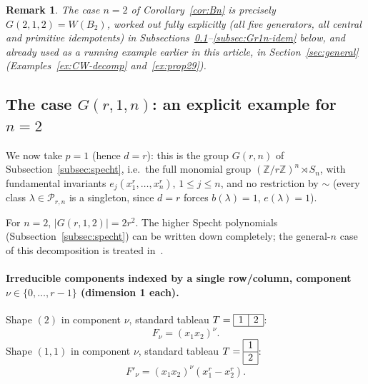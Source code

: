 \documentclass[11pt,a4paper]{article}
\newtheorem{remark}[theorem]{Remark}
\begin{document}
\begin{remark}
The case $n=2$ of Corollary~\ref{cor:Bn} is precisely
$G(2,1,2) = W(B_2)$, worked out fully explicitly (all five generators,
all central and primitive idempotents) in
Subsections~\ref{subsec:Gr1n}--\ref{subsec:Gr1n-idem} below, and
already used as a running example earlier in this article, in
Section~\ref{sec:general}
(Examples~\ref{ex:CW-decomp} and~\ref{ex:prop29}).
\end{remark}

\subsection{The case $G(r,1,n)$: an explicit example for $n=2$}\label{subsec:Gr1n}

We now take $p=1$ (hence $d=r$): this is the group $G(r,n)$ of
Subsection~\ref{subsec:specht}, i.e.\ the full monomial
group $(\mathbb{Z}/r\mathbb{Z})^n \rtimes S_n$, with fundamental
invariants $e_j(x_1^r,\dots,x_n^r)$, $1\le j\le n$, and no restriction
by $\sim$ (every class $\lambda \in \mathcal{P}_{r,n}$ is a singleton, since
$d=r$ forces $b(\lambda)=1$, $e(\lambda)=1$).

For $n=2$, $|G(r,1,2)| = 2r^2$. The higher Specht polynomials
(Subsection~\ref{subsec:specht}) can be written down completely; the
general-$n$ case of this decomposition is treated
in~\cite{NonkaneLawson2022}.

\paragraph{Irreducible components indexed by a single row/column,
component $\nu \in \{0,\dots,r-1\}$ (dimension 1 each).}
Shape $(2)$ in component $\nu$, standard tableau
$T = \begin{array}{|c|c|}\hline 1 & 2\\\hline\end{array}$:
\[
 F_\nu = (x_1 x_2)^{\nu}.
\]
Shape $(1,1)$ in component $\nu$, standard tableau
$T = \begin{array}{|c|}\hline 1\\\hline 2\\\hline\end{array}$:
\[
 F'_\nu = (x_1x_2)^{\nu}(x_1^{r} - x_2^{r}).
\]
\end{document}
